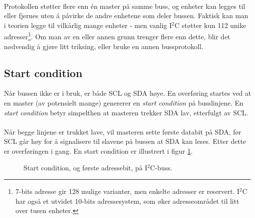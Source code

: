 \documentclass[11pt,a4paper]{article}
\begin{document}
\\
Protokollen støtter flere enn én master på samme buss, og enheter kan legges til eller fjernes uten å påvirke de andre enhetene som deler bussen. Faktisk kan man i teorien legge til vilkårlig mange enheter - men vanlig I$^2$C støtter kun 112 unike adresser\footnote{7-bits adresse gir 128 mulige varianter, men enkelte adresser er reservert. I$^2$C har også et utvidet 10-bits adressesystem, som øker adresseområdet til litt over tusen enheter.}. Om man av en eller annen grunn trenger flere enn dette, blir det nødvendig å gjøre litt triksing, eller bruke en annen bussprotokoll.
\subsection*{Start condition}
Når bussen ikke er i bruk, er både SCL og SDA høye. En overføring startes ved at en master (av potensielt mange) genererer en \textit{start condition} på busslinjene. En \textit{start condition} betyr simpelthen at masteren trekker SDA lav, etterfulgt av SCL.\\
\\
Når begge linjene er trukket lave, vil masteren sette første databit på SDA, før SCL går høy for å signalisere til slavene på bussen at SDA kan leses. Etter dette er overføringen i gang. En start condition er illustrert i figur \ref{fig::i2c::start_condition}.
\begin{figure}[h]
\centering
{}
\caption{Start condition, og første adressebit, på I$^2$C-buss.}
\label{fig::i2c::start_condition}
\end{figure}
\end{document}

